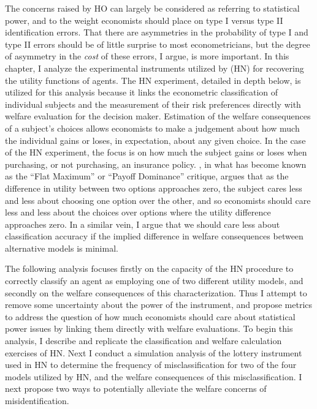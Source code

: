 \documentclass[../main.tex]{subfiles}
\begin{document}
The concerns raised by HO can largely be considered as referring to statistical power, and to the weight economists should place on type I versus type II identification errors.
That there are asymmetries in the probability of type I and type II errors should be of little surprise to most econometricians, but the degree of asymmetry in the \textit{cost} of these errors, I argue, is more important.
In this chapter, I analyze the experimental instruments utilized by \textcite{Harrison2016} (HN) for recovering the utility functions of agents.
The HN experiment, detailed in depth below, is utilized for this analysis because it links the econometric classification of individual subjects and the measurement of their risk preferences directly with welfare evaluation for the decision maker.
Estimation of the welfare consequences of a subject's choices allows economists to make a judgement about how much the individual gains or loses, in expectation, about any given choice.
In the case of the HN experiment, the focus is on how much the subject gains or loses when purchasing, or not purchasing, an insurance policy.
\textcite{Harrison1989, Harrison1992}, in what has become known as the \enquote{Flat Maximum} or \enquote{Payoff Dominance} critique, argues that as the difference in utility between two options approaches zero, the subject cares less and less about choosing one option over the other, and so economists should care less and less about the choices over options where the utility difference approaches zero.
In a similar vein, I argue that we should care less about classification accuracy if the implied difference in welfare consequences between alternative models is minimal.

The following analysis focuses firstly on the capacity of the HN procedure to correctly classify an agent as employing one of two different utility models, and secondly on the welfare consequences of this characterization.
Thus I attempt to remove some uncertainty about the power of the instrument, and propose metrics to address the question of how much economists should care about statistical power issues by linking them directly with welfare evaluations.
To begin this analysis, I describe and replicate the classification and welfare calculation exercises of HN.
Next I conduct a simulation analysis of the lottery instrument used in HN to determine the frequency of misclassification for two of the four models utilized by HN, and the welfare consequences of this misclassification.
I next propose two ways to potentially alleviate the welfare concerns of misidentification.
\end{document}
